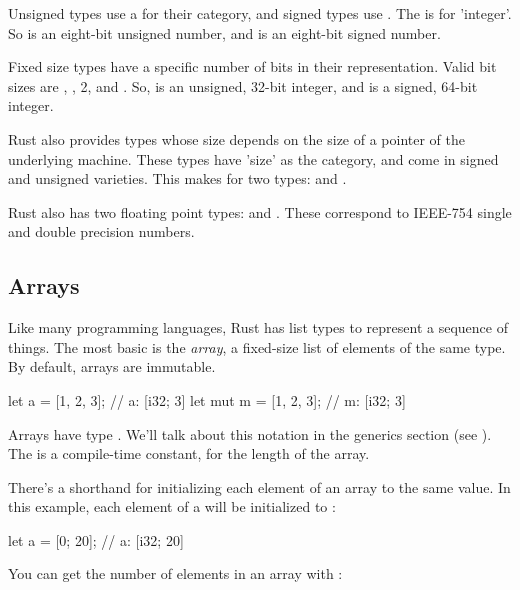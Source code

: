 \blank

Unsigned types use a  for their category, and signed types use . The  is for 'integer'. So  is an 
eight-bit unsigned number, and  is an eight-bit signed number.


Fixed size types have a specific number of bits in their representation. Valid bit sizes are , , 2, and .
So,  is an unsigned, 32-bit integer, and  is a signed, 64-bit integer.


Rust also provides types whose size depends on the size of a pointer of the underlying machine. These types have 'size' as the category,
and come in signed and unsigned varieties. This makes for two types:  and .


Rust also has two floating point types:  and . These correspond to IEEE-754 single and double precision numbers.

\subsection*{Arrays}

Like many programming languages, Rust has list types to represent a sequence of things. The most basic is the \emph{array}, a 
fixed-size list of elements of the same type. By default, arrays are immutable.

\begin{rustc}
let a = [1, 2, 3]; // a: [i32; 3]
let mut m = [1, 2, 3]; // m: [i32; 3]
\end{rustc}

Arrays have type \code{[T; N]}. We'll talk about this  notation in the generics section (see ). 
The  is a compile-time constant, for the length of the array.

\blank

There's a shorthand for initializing each element of an array to the same value. In this example, each element of a will be initialized 
to :

\begin{rustc}
let a = [0; 20]; // a: [i32; 20]
\end{rustc}

You can get the number of elements in an array  with :

